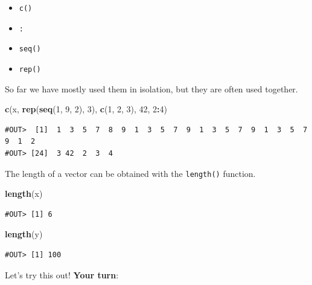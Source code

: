 \documentclass[]{book}
\newenvironment{Shaded}{\begin{snugshade}}{\end{snugshade}}
\newcommand{\DecValTok}[1]{\textcolor[rgb]{0.00,0.00,0.81}{#1}}
\newcommand{\KeywordTok}[1]{\textcolor[rgb]{0.13,0.29,0.53}{\textbf{#1}}}
\newcommand{\NormalTok}[1]{#1}
\newcommand{\OperatorTok}[1]{\textcolor[rgb]{0.81,0.36,0.00}{\textbf{#1}}}
\providecommand{\tightlist}{%
  \setlength{\itemsep}{0pt}\setlength{\parskip}{0pt}}
\newenvironment{warning}{\begin{tcolorbox}[colback=orange!5!white,colframe=orange]}{\end{tcolorbox}}
\begin{document}
\begin{itemize}
\tightlist
\item
  \texttt{c()}
\item
  \texttt{:}
\item
  \texttt{seq()}
\item
  \texttt{rep()}
\end{itemize}

So far we have mostly used them in isolation, but they are often used together.

\begin{Shaded}
\begin{Highlighting}[]
\KeywordTok{c}\NormalTok{(x, }\KeywordTok{rep}\NormalTok{(}\KeywordTok{seq}\NormalTok{(}\DecValTok{1}\NormalTok{, }\DecValTok{9}\NormalTok{, }\DecValTok{2}\NormalTok{), }\DecValTok{3}\NormalTok{), }\KeywordTok{c}\NormalTok{(}\DecValTok{1}\NormalTok{, }\DecValTok{2}\NormalTok{, }\DecValTok{3}\NormalTok{), }\DecValTok{42}\NormalTok{, }\DecValTok{2}\OperatorTok{:}\DecValTok{4}\NormalTok{)}
\end{Highlighting}
\end{Shaded}

\begin{verbatim}
#OUT>  [1]  1  3  5  7  8  9  1  3  5  7  9  1  3  5  7  9  1  3  5  7  9  1  2
#OUT> [24]  3 42  2  3  4
\end{verbatim}

The length of a vector can be obtained with the \texttt{length()} function.

\begin{Shaded}
\begin{Highlighting}[]
\KeywordTok{length}\NormalTok{(x)}
\end{Highlighting}
\end{Shaded}

\begin{verbatim}
#OUT> [1] 6
\end{verbatim}

\begin{Shaded}
\begin{Highlighting}[]
\KeywordTok{length}\NormalTok{(y)}
\end{Highlighting}
\end{Shaded}

\begin{verbatim}
#OUT> [1] 100
\end{verbatim}

\begin{warning}
Let's try this out! \textbf{Your turn}:
\end{warning}
\end{document}
